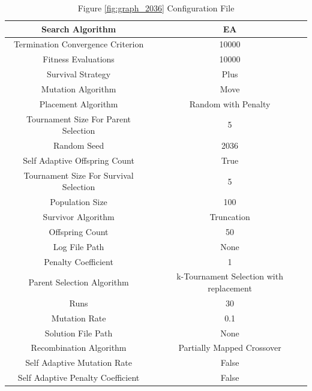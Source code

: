 \documentclass{standalone}
\begin{document}
\begin{table}[!htb]
	\centering
	\caption{Figure \ref{fig:graph_2036} Configuration File}
	\label{tab:graph_2036}
	\begin{tabular}{| c | c |}
		\hline
		Search Algorithm		& EA		 \\
		\hline
		Termination Convergence Criterion		& 10000		 \\
		\hline
		Fitness Evaluations		& 10000		 \\
		\hline
		Survival Strategy		& Plus		 \\
		\hline
		Mutation Algorithm		& Move		 \\
		\hline
		Placement Algorithm		& Random with Penalty		 \\
		\hline
		Tournament Size For Parent Selection		& 5		 \\
		\hline
		Random Seed		& 2036		 \\
		\hline
		Self Adaptive Offspring Count		& True		 \\
		\hline
		Tournament Size For Survival Selection		& 5		 \\
		\hline
		Population Size		& 100		 \\
		\hline
		Survivor Algorithm		& Truncation		 \\
		\hline
		Offspring Count		& 50		 \\
		\hline
		Log File Path		& None		 \\
		\hline
		Penalty Coefficient		& 1		 \\
		\hline
		Parent Selection Algorithm		& k-Tournament Selection with replacement		 \\
		\hline
		Runs		& 30		 \\
		\hline
		Mutation Rate		& 0.1		 \\
		\hline
		Solution File Path		& None		 \\
		\hline
		Recombination Algorithm		& Partially Mapped Crossover		 \\
		\hline
		Self Adaptive Mutation Rate		& False		 \\
		\hline
		Self Adaptive Penalty Coefficient		& False		 \\
		\hline
	\end{tabular}
\end{table}
\end{document}
